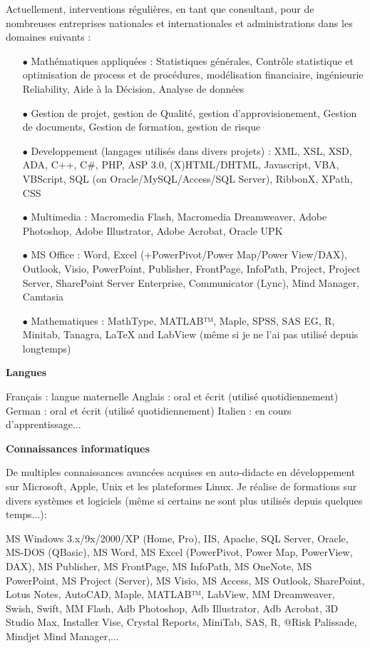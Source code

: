 Actuellement, interventions régulières, en tant que consultant, pour de nombreuses entreprises nationales et internationales et  administrations dans les domaines suivants :
\begin{itemize}	 
	\item[$\bullet$] Mathématiques appliquées : Statistiques générales, Contrôle statistique et optimisation de process et de procédures, modélisation financiaire, ingénieurie Reliability, Aide à la Décision, Analyse de données

	\item[$\bullet$] Gestion de projet, gestion de Qualité, gestion d'approvisionement, Gestion de documents, Gestion de formation, gestion de risque

	\item[$\bullet$] Developpement (langages utilisés dans divers projets) : XML, XSL, XSD, ADA, C++, C\#, PHP, ASP 3.0, (X)HTML/DHTML, Javascript, VBA, VBScript, SQL (on Oracle/MySQL/Access/SQL Server), RibbonX, XPath, CSS

	\item[$\bullet$] Multimedia : Macromedia Flash, Macromedia Dreamweaver, Adobe Photoshop, Adobe Illustrator, Adobe Acrobat, Oracle UPK

	\item[$\bullet$] MS Office : Word, Excel (+PowerPivot/Power Map/Power View/DAX), Outlook, Visio, PowerPoint, Publisher, FrontPage, InfoPath, Project, Project Server, SharePoint Server Enterprise, Communicator (Lync), Mind Manager, Camtasia

	\item[$\bullet$] Mathematiques : MathType, MATLAB™, Maple, SPSS, SAS EG, R, Minitab, Tanagra, LaTeX and LabView (même si je ne l'ai pas utilisé depuis longtemps)
\end{itemize}
\textbf{Langues}

Français : langue maternelle
Anglais : oral et écrit (utilisé quotidiennement)
German : oral et écrit (utilisé quotidiennement)
Italien : en cours d'apprentissage...

\textbf{Connaissances informatiques}

De multiples connaissances avancées acquises en auto-didacte en développement sur Microsoft, Apple, Unix et les plateformes Linux. Je réalise de formations sur divers systèmes et logiciels (même si certains ne sont plus utilisés depuis quelques temps...):

MS Windows 3.x/9x/2000/XP (Home, Pro), IIS, Apache, SQL Server, Oracle, MS-DOS (QBasic), MS Word, MS Excel (PowerPivot, Power Map, PowerView, DAX), MS Publisher, MS FrontPage, MS InfoPath, MS OneNote, MS PowerPoint, MS Project (Server), MS Visio, MS Access, MS Outlook, SharePoint, Lotus Notes, AutoCAD, Maple, MATLAB™, LabView, MM Dreamweaver, Swish, Swift, MM Flash, Adb Photoshop, Adb Illustrator, Adb Acrobat, 3D Studio Max, Installer Vise, Crystal Reports, MiniTab, SAS, R, @Risk Palissade, Mindjet Mind Manager,...

